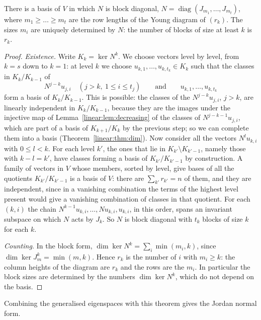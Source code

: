 \begin{theorem}\label{linear:thm:jordannil}
There is a basis of $V$ in which $N$ is block diagonal, $N=\operatorname{diag}(J_{m_1},\dots,J_{m_t})$, where $m_1\ge\dots\ge
m_t$ are the row lengths of the Young diagram of $(r_k)$. The sizes $m_i$ are uniquely determined by $N$: the number of
blocks of size at least $k$ is $r_k$.
\end{theorem}
\begin{proof}
\emph{Existence.} Write $K_k=\ker N^k$. We choose vectors level by level, from $k=s$ down to $k=1$: at level $k$ we choose
$u_{k,1},\dots,u_{k,t_k}\in K_k$ such that the classes in $K_k/K_{k-1}$ of
\[
N^{j-k}u_{j,i}\quad(j>k,\ 1\le i\le t_j)\qquad\text{and}\qquad u_{k,1},\dots,u_{k,t_k}
\]
form a basis of $K_k/K_{k-1}$. This is possible: the classes of the $N^{j-k}u_{j,i}$, $j>k$, are linearly independent in
$K_k/K_{k-1}$, because they are the images under the injective map of Lemma~\ref{linear:lem:decreasing} of the classes of
$N^{j-k-1}u_{j,i}$, which are part of a basis of $K_{k+1}/K_k$ by the previous step; so we can complete them into a basis
(Theorem~\ref{linear:thm:dim}). Now consider all the vectors $N^lu_{k,i}$ with $0\le l<k$. For each level $k'$, the ones that lie in
$K_{k'}\setminus K_{k'-1}$, namely those with $k-l=k'$, have classes forming a basis of $K_{k'}/K_{k'-1}$ by construction.
A family of vectors in $V$ whose members, sorted by level, give bases of all the quotients $K_{k'}/K_{k'-1}$ is a basis of $V$:
there are $\sum_{k'}r_{k'}=n$ of them, and they are independent, since in a vanishing combination the terms of the highest
level present would give a vanishing combination of classes in that quotient. For each $(k,i)$ the chain
$N^{k-1}u_{k,i},\dots,Nu_{k,i},u_{k,i}$, in this order, spans an invariant subspace on which $N$ acts by $J_k$. So $N$ is block
diagonal with $t_k$ blocks of size $k$ for each $k$.

\emph{Counting.} In the block form, $\dim\ker N^k=\sum_i\min(m_i,k)$, since $\dim\ker J_m^k=\min(m,k)$. Hence $r_k$ is the
number of $i$ with $m_i\ge k$: the column heights of the diagram are $r_k$ and the rows are the $m_i$. In particular the
block sizes are determined by the numbers $\dim\ker N^k$, which do not depend on the basis.
\end{proof}

Combining the generalised eigenspaces with this theorem gives the Jordan normal form.

